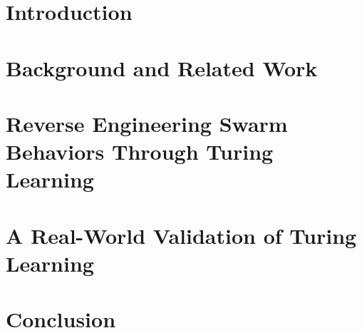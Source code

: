 \documentclass[a4paper, twoside, 12pt]{scrbook}
\begin{document}

\frontmatter


%
\cleardoublepage

%

\renewcommand{\baselinestretch}{1.30}\normalsize


\cleardoublepage


%
\setcounter{tocdepth}{4}
\tableofcontents


\mainmatter

\chapter{Introduction}\label{ch:introduction}


\chapter{Background and Related Work}\label{ch:literature_review}


\chapter{Reverse Engineering Swarm Behaviors Through Turing Learning}\label{ch:swarm_simulation}


\chapter{A Real-World Validation of Turing Learning}\label{ch:swarm_physical_implementation}




\chapter{Conclusion}\label{ch:conclusion}




\end{document}
